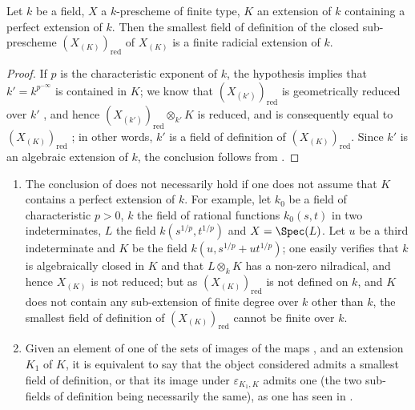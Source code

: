 \begin{proposition}[4.8.14]
\label{IV.4.8.14}
Let $k$ be a field, $X$ a $k$-prescheme of finite type, $K$ an extension of $k$ containing a perfect extension of $k$.
Then the smallest field of definition of the closed sub-prescheme $(X_{(K)})_{\mathrm{red}}$ of $X_{(K)}$ is a finite radicial extension of $k$.
\end{proposition}

\begin{proof}
If $p$ is the characteristic exponent of $k$, the hypothesis implies that $k'=k^{p^{-\infty}}$ is contained in $K$; we know that $(X_{(k')})_{\mathrm{red}}$ is geometrically reduced over $k'$ , and hence $(X_{(k')})_{\mathrm{red}}\otimes_{k'} K$ is reduced, and is consequently equal to $(X_{(K)})_{\mathrm{red}}$ ; in other words, $k'$ is a field of definition of $(X_{(K)})_{\mathrm{red}}$.
Since $k'$ is an algebraic extension of $k$, the conclusion follows from .
\end{proof}

\begin{remarks}[4.8.15]
\label{IV.4.8.15}
\begin{enumerate}[label=(\roman*)]
  \item The conclusion of  does not necessarily hold if one does not assume that $K$ contains a perfect extension of $k$.
For example, let $k_0$ be a field of characteristic $p>0$, $k$ the field of rational functions $k_0(s,t)$ in two indeterminates, $L$ the field $k(s^{1/p},t^{1/p})$ and $X=\Spec(L)$.
Let $u$ be a third indeterminate and $K$ be the field $k(u,s^{1/p}+ut^{1/p})$; one easily verifies that $k$ is algebraically closed in $K$ and that $L\otimes_k K$ has a non-zero nilradical, and hence $X_{(K)}$ is not reduced; but as $(X_{(K)})_{\mathrm{red}}$ is not defined on $k$, and $K$ does not contain any sub-extension of finite degree over $k$ other than $k$, the smallest field of definition of $(X_{(K)})_{\mathrm{red}}$ cannot be finite over $k$.
  \item Given an element of one of the sets of images of the maps , and an extension $K_1$ of $K$, it is equivalent to say that the object considered admits a smallest field of definition, or that its image under $\varepsilon_{K_1,K}$ admits one (the two sub-fields of definition being necessarily the same), as one has seen in .
\end{enumerate}
\end{remarks}


